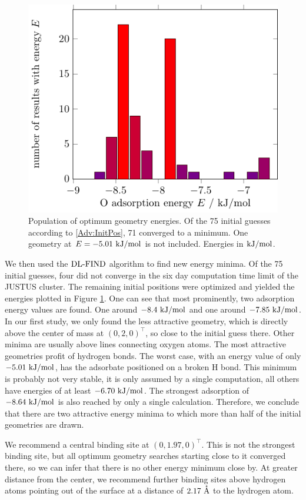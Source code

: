 \begin{figure}[b!]
\centering
\includegraphics[width=.8\textwidth]{./TikzPics/TikzCreation/BindingEnergyDistribution/BindingEnergyDistribution.pdf}
\caption{Population of optimum geometry energies. Of the 75 initial guesses
according to \eqref{Adv:InitPos}, 71 converged to a minimum. One
geometry at $E=-5.01~\text {kJ/mol}$ is not included. Energies in $\text {kJ/mol}$.}
\label{Fig:Adv:BindingSitesEnergies}
\end{figure}

We then used the $\text{DL-FIND}$ algorithm to find new energy minima. Of the 75
initial guesses, four did not converge in the six day computation time limit
of the JUSTUS cluster. The remaining initial positions were optimized
and yielded the energies plotted in Figure \ref{Fig:Adv:BindingSitesEnergies}.
One can see that most prominently, two adsorption energy values are found. One
around $-8.4~\text {kJ/mol}$ and one around $-7.85~\text {kJ/mol}$. In our first study, we only
found the less attractive geometry, which is directly above the center of mass
at $(0,2,0)^\intercal$, so close to the initial guess there. Other minima are
usually above lines connecting oxygen atoms. The most attractive geometries
profit of hydrogen bonds. The worst case, with an energy value of only
$-5.01~\text {kJ/mol}$, has the adsorbate positioned on a broken H bond. This minimum is
probably not very stable, it is only assumed by a single computation, all
others have energies of at least $-6.70~\text {kJ/mol}$. The strongest adsorption of
$-8.64~\text {kJ/mol}$ is also reached by only a single calculation. Therefore, we
conclude that there are two attractive energy minima to which more
than half of the initial geometries are drawn.

We recommend a central binding site at $(0,1.97,0)^\intercal$. This is not the
strongest binding site, but all optimum geometry searches starting close to it
converged there, so we can infer that there is no other energy minimum close by.
At greater distance from the center, we recommend further binding sites above
hydrogen atoms pointing out of the surface at a distance of $2.17~\mathring{\text{A}}$ to the
hydrogen atom.

